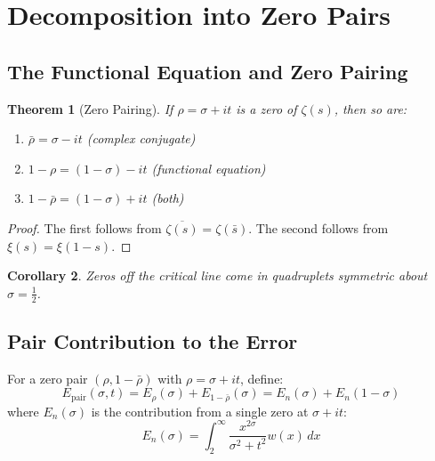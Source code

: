 \documentclass[12pt,a4paper]{article}
\newtheorem{theorem}{Theorem}[section]
\newtheorem{corollary}[theorem]{Corollary}
\theoremstyle{definition}
\theoremstyle{remark}
\newcommand{\Epair}{E_{\text{pair}}}
\begin{document}
\section{Decomposition into Zero Pairs}
\label{sec:pairs}

\subsection{The Functional Equation and Zero Pairing}

\begin{theorem}[Zero Pairing]
\label{thm:pairing}
If $\rho = \sigma + it$ is a zero of $\zeta(s)$, then so are:
\begin{enumerate}
    \item $\bar{\rho} = \sigma - it$ (complex conjugate)
    \item $1 - \rho = (1-\sigma) - it$ (functional equation)
    \item $1 - \bar{\rho} = (1-\sigma) + it$ (both)
\end{enumerate}
\end{theorem}

\begin{proof}
The first follows from $\overline{\zeta(s)} = \zeta(\bar{s})$. The second follows from $\xi(s) = \xi(1-s)$.
\end{proof}

\begin{corollary}
Zeros off the critical line come in quadruplets symmetric about $\sigma = \frac{1}{2}$.
\end{corollary}

\subsection{Pair Contribution to the Error}

For a zero pair $(\rho, 1-\bar{\rho})$ with $\rho = \sigma + it$, define:
\begin{equation}
\Epair(\sigma, t) = E_\rho(\sigma) + E_{1-\bar{\rho}}(\sigma) = E_n(\sigma) + E_n(1-\sigma)
\end{equation}
where $E_n(\sigma)$ is the contribution from a single zero at $\sigma + it$:
\begin{equation}
E_n(\sigma) = \int_2^\infty \frac{x^{2\sigma}}{\sigma^2 + t^2} w(x) \, dx
\end{equation}
\end{document}
